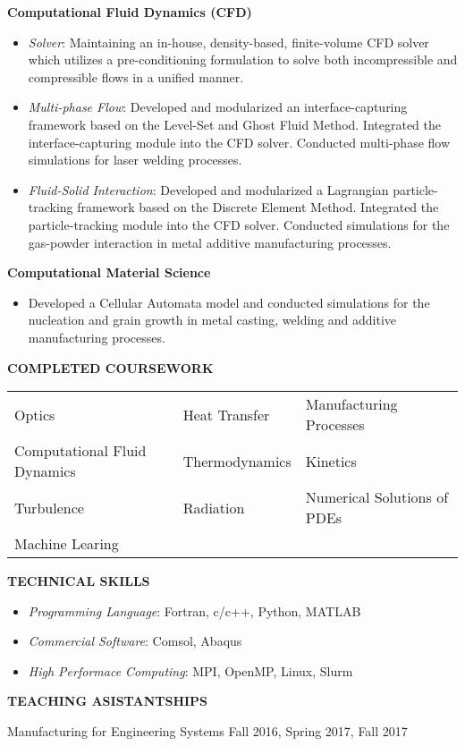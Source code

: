 \documentclass[11pt, letterpaper]{article}
\begin{document}
\fullrule
\textbf{Computational Fluid Dynamics (CFD)}
\begin{itemize}[leftmargin=*, labelsep=5mm]
   \item \textit{Solver}: Maintaining an in-house, density-based, finite-volume CFD solver which utilizes a pre-conditioning formulation to solve both incompressible and compressible flows in a unified manner. 
   \item \textit{Multi-phase Flow}: Developed and modularized an interface-capturing framework based on the Level-Set and Ghost Fluid Method. Integrated the interface-capturing module into the CFD solver. Conducted multi-phase flow simulations for laser welding processes.
   \item \textit{Fluid-Solid Interaction}: Developed and modularized a Lagrangian particle-tracking framework based on the Discrete Element Method. Integrated the particle-tracking module into the CFD solver. Conducted simulations for the gas-powder interaction in metal additive manufacturing processes.
\end{itemize}

\vspace{3pt}
\textbf{Computational Material Science}
\begin{itemize}[leftmargin=*, labelsep=5mm]
   \item Developed a Cellular Automata model and conducted simulations for the nucleation and grain growth in metal casting, welding and additive manufacturing processes.
\end{itemize}
\vspace{-3pt}
\paraspace
\textbf{COMPLETED COURSEWORK}

\fullrule
\vspace{3pt}
\begin{tabular}{@{} p{} p{} p{} @{}}
   Optics & Heat Transfer & Manufacturing Processes \\
   Computational Fluid Dynamics & Thermodynamics & Kinetics \\
   Turbulence & Radiation & Numerical Solutions of PDEs \\
   Machine Learing & & 
\end{tabular}

\paraspace
\textbf{TECHNICAL SKILLS}

\fullrule

\begin{itemize}[leftmargin=*, labelsep=3mm, itemsep=2pt, topsep=0pt]
   \item \textit{Programming Language}: Fortran, c/c++, Python, MATLAB
   \item \textit{Commercial Software}: Comsol, Abaqus
   \item \textit{High Performace Computing}: MPI, OpenMP, Linux, Slurm
\end{itemize}

\paraspace
\textbf{TEACHING ASISTANTSHIPS}

\fullrule
Manufacturing for Engineering Systems \hfill Fall 2016, Spring 2017, Fall 2017
\end{document}
